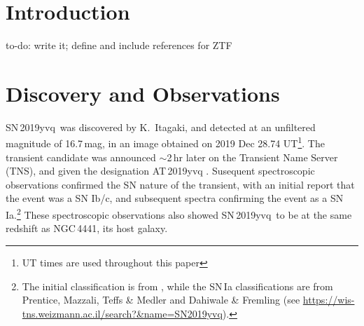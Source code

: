 \documentclass[twocolumn]{aastex63}
\newcommand{\todo}[1]{{\color{magenta} to-do: {#1}}}
\newcommand{\sn}{SN\,2019yvq}
\begin{document}

\author{ZTF}

\author{et al.}


\begin{abstract}

\todo{Write the abstract}

\end{abstract}

\keywords{}

\section{Introduction} \label{sec:intro}

\todo{write it; define and include references for ZTF}

\section{Discovery and Observations}\label{sec:obs}

\sn\ was discovered by K.~Itagaki, and detected at an unfiltered magnitude
of 16.7\,mag, in an image obtained on 2019 Dec 28.74 UT\footnote{UT times
are used throughout this paper}. The transient candidate was announced
$\sim$2\,hr later on the Transient Name Server (TNS), and given the
designation AT\,2019yvq \citep{Itagaki19}. Susequent spectroscopic
observations confirmed the SN nature of the transient, with an initial
report that the event was a SN Ib/c, and subsequent spectra confirming the
event as a SN Ia.\footnote{The initial classification is from
\citet{Kawabata20}, while the SN\,Ia classifications are from Prentice,
Mazzali, Teffs \& Medler and Dahiwale \& Fremling (see
\url{https://wis-tns.weizmann.ac.il/search?&name=SN2019yvq}).} These
spectroscopic observations also showed \sn\ to be at the same redshift as
NGC\,4441, its host galaxy.
\end{document}
